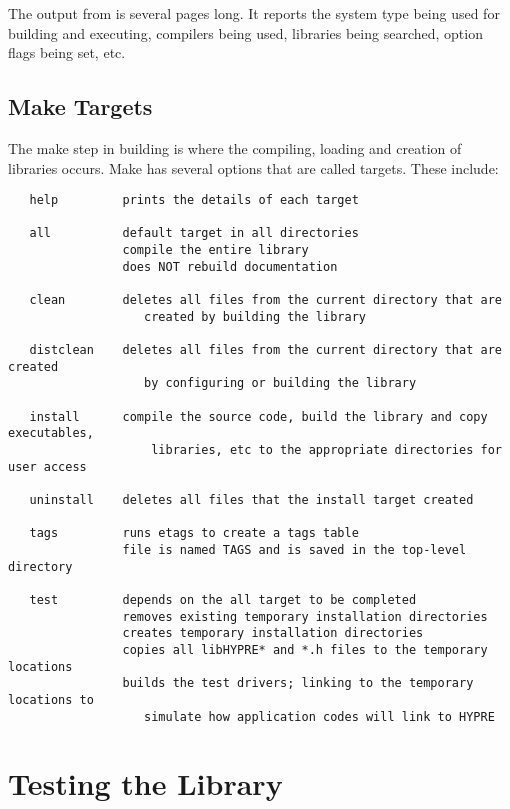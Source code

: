 The output from  is several pages long.  It reports the system type 
being used for building and executing, compilers being used, libraries being searched,
option flags being set, etc.  


\subsection{Make Targets}

The make step in building \hypre{} is where the compiling, loading and creation 
of libraries occurs.  Make has several options that are called targets.  These include:
\begin{verbatim}
   help         prints the details of each target

   all          default target in all directories
                compile the entire library
                does NOT rebuild documentation

   clean        deletes all files from the current directory that are 
                   created by building the library

   distclean    deletes all files from the current directory that are created
                   by configuring or building the library

   install      compile the source code, build the library and copy executables,
                    libraries, etc to the appropriate directories for user access

   uninstall    deletes all files that the install target created

   tags         runs etags to create a tags table
                file is named TAGS and is saved in the top-level directory

   test         depends on the all target to be completed
                removes existing temporary installation directories
                creates temporary installation directories
                copies all libHYPRE* and *.h files to the temporary locations
                builds the test drivers; linking to the temporary locations to
                   simulate how application codes will link to HYPRE
\end{verbatim}



\section{Testing the Library} 

